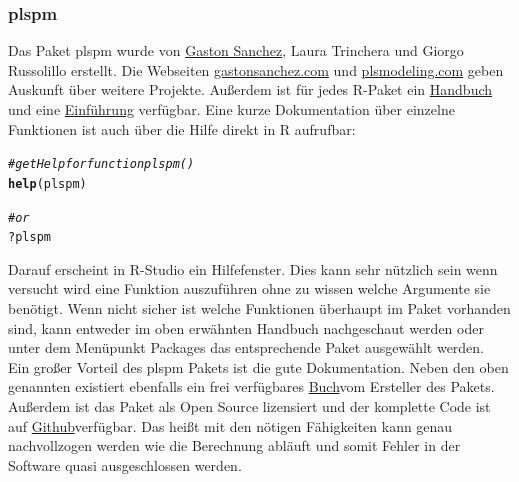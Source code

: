 \documentclass{article}\usepackage[]{graphicx}\usepackage[]{color}
\makeatletter
\newcommand{\hlcom}[1]{\textcolor[rgb]{0.678,0.584,0.686}{\textit{#1}}}%
\newcommand{\hlopt}[1]{\textcolor[rgb]{0,0,0}{#1}}%
\newcommand{\hlstd}[1]{\textcolor[rgb]{0.345,0.345,0.345}{#1}}%
\newcommand{\hlkwd}[1]{\textcolor[rgb]{0.737,0.353,0.396}{\textbf{#1}}}%
\newenvironment{kframe}{%
 \def\at@end@of@kframe{}%
 \ifinner\ifhmode%
  \def\at@end@of@kframe{\end{minipage}}%
  \begin{minipage}{\columnwidth}%
 \fi\fi%
 \def\FrameCommand##1{\hskip\@totalleftmargin \hskip-\fboxsep
 \colorbox{shadecolor}{##1}\hskip-\fboxsep
     \hskip-\linewidth \hskip-\@totalleftmargin \hskip\columnwidth}%
 \MakeFramed {\advance\hsize-\width
   \@totalleftmargin\z@ \linewidth\hsize
   \@setminipage}}%
 {\par\unskip\endMakeFramed%
 \at@end@of@kframe}
\newenvironment{knitrout}{}{} %
\makeatother
\begin{document}
\subsubsection{plspm}
Das Paket plspm\cite{sanchez2013pls} wurde von \href{gaston.stat@gmail.com}{Gaston Sanchez}, Laura Trinchera und Giorgo Russolillo erstellt. Die Webseiten \href{http://gastonsanchez.com}{gastonsanchez.com} und \href{http://www.plsmodeling.com/}{plsmodeling.com} geben Auskunft über weitere Projekte. Außerdem ist für jedes R-Paket ein \href{http://cran.r-project.org/web/packages/plspm/plspm.pdf}{Handbuch} und eine \href{http://cran.r-project.org/web/packages/plspm/vignettes/plspm_introduction.pdf}{Einführung} verfügbar. Eine kurze Dokumentation über einzelne Funktionen ist auch über die Hilfe direkt in R aufrufbar:
\begin{knitrout}
\color{fgcolor}\begin{kframe}
\begin{alltt}
\hlcom{#get Help for function plspm()}
\hlkwd{help}\hlstd{(plspm)}

\hlcom{#or}
\hlopt{?}\hlstd{plspm}
\end{alltt}
\end{kframe}
\end{knitrout}
Darauf erscheint in R-Studio ein Hilfefenster. Dies kann sehr nützlich sein wenn versucht wird eine Funktion auszuführen ohne zu wissen welche Argumente sie benötigt. Wenn nicht sicher ist welche Funktionen überhaupt im Paket vorhanden sind, kann entweder im oben erwähnten Handbuch nachgeschaut werden oder unter dem Menüpunkt Packages das entsprechende Paket ausgewählt werden.\\
Ein großer Vorteil des plspm Pakets ist die gute Dokumentation. Neben den oben genannten existiert ebenfalls ein frei verfügbares \href{http://www.gastonsanchez.com/PLS Path Modeling with R.pdf}{Buch}\cite{sanchez2013pls}vom Ersteller des Pakets. Außerdem ist das Paket als Open Source lizensiert und der komplette Code ist auf \href{https://github.com/gastonstat/plspm}{Github}verfügbar. Das heißt mit den nötigen Fähigkeiten kann genau nachvollzogen werden wie die Berechnung abläuft und somit Fehler in der Software quasi ausgeschlossen werden.\\
\end{document}
